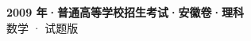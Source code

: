 \documentclass[zihao=-4, a4paper]{ctexart}
\begin{document}
\begin{center}
  {\Large\bfseries 2009 年·普通高等学校招生考试·安徽卷·理科}\\[4pt]
  {\large 数学 · 试题版}
\end{center}
\medskip
{}

\end{document}
